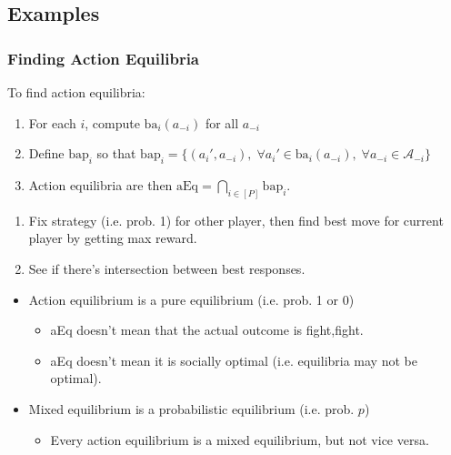 \subsection{Examples}
\subsubsection{Finding Action Equilibria}
\begin{process} To find action equilibria:
    \begin{enumerate}
        \item For each $i$, compute $\text{ba}_i (a_{-i})$ for all $a_{-i}$
        \item Define $\text{bap}_i$ so that $\text{bap}_i = \{(a_i',a_{-i}), \; \forall a_i' \in \text{ba}_i (a_{-i}), \; \forall a_{-i} \in \mathcal{A}_{-i}\}$
        \item Action equilibria are then $\text{aEq} = \bigcap_{i\in [P]} \text{bap}_i$.
    \end{enumerate}
\end{process}

\begin{process}
    \begin{enumerate}
        \item Fix strategy (i.e. prob. 1) for other player, then find best move for current player by getting max reward. 
        \item See if there's intersection between best responses.
    \end{enumerate}
\end{process}

\begin{warning}
    \begin{itemize}
        \item Action equilibrium is a pure equilibrium (i.e. prob. 1 or 0)
        \begin{itemize}
            \item aEq doesn't mean that the actual outcome is fight,fight. 
            \item aEq doesn't mean it is socially optimal (i.e. equilibria may not be optimal). 
        \end{itemize}
        \item Mixed equilibrium is a probabilistic equilibrium (i.e. prob. $p$)
        \begin{itemize}
            \item Every action equilibrium is a mixed equilibrium, but not vice versa.
        \end{itemize}
    \end{itemize}
\end{warning}
\newpage

